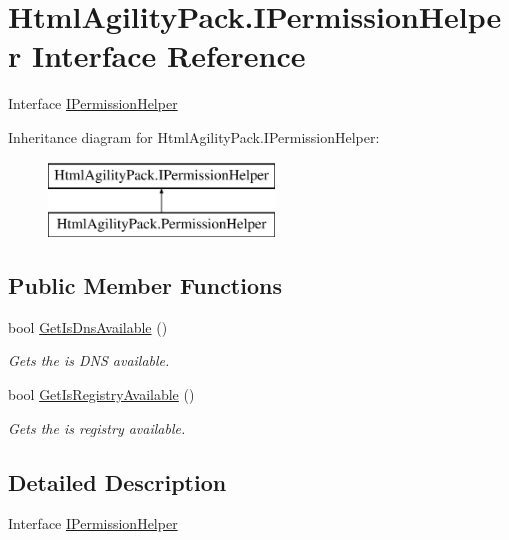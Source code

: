 \hypertarget{interface_html_agility_pack_1_1_i_permission_helper}{}\section{Html\+Agility\+Pack.\+I\+Permission\+Helper Interface Reference}
\label{interface_html_agility_pack_1_1_i_permission_helper}


Interface \hyperlink{interface_html_agility_pack_1_1_i_permission_helper}{I\+Permission\+Helper}  


Inheritance diagram for Html\+Agility\+Pack.\+I\+Permission\+Helper\+:\begin{figure}[H]
\begin{center}
\leavevmode
\includegraphics[height=2.000000cm]{interface_html_agility_pack_1_1_i_permission_helper}
\end{center}
\end{figure}
\subsection*{Public Member Functions}
\begin{DoxyCompactItemize}
\item 
bool \hyperlink{interface_html_agility_pack_1_1_i_permission_helper_ae4bd1e14d6dc7c398fbef8bfc76bc83e}{Get\+Is\+Dns\+Available} ()
\begin{DoxyCompactList}\small\item\em Gets the is D\+NS available. \end{DoxyCompactList}\item 
bool \hyperlink{interface_html_agility_pack_1_1_i_permission_helper_a1ac2ee4504f537df82920c718d525035}{Get\+Is\+Registry\+Available} ()
\begin{DoxyCompactList}\small\item\em Gets the is registry available. \end{DoxyCompactList}\end{DoxyCompactItemize}


\subsection{Detailed Description}
Interface \hyperlink{interface_html_agility_pack_1_1_i_permission_helper}{I\+Permission\+Helper} 



